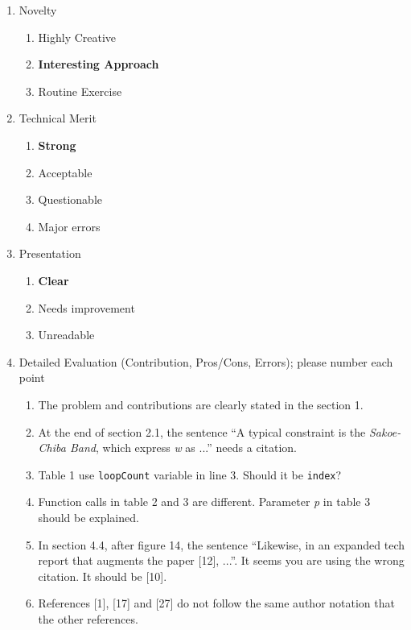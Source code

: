 \documentclass{article}
\begin{document}
\begin{enumerate}
 \item Novelty
 \begin{enumerate}[I]
  \item Highly Creative
  \item \textbf{Interesting Approach}
  \item Routine Exercise
 \end{enumerate} 
 
 \item Technical Merit
 \begin{enumerate}[I]
  \item \textbf{Strong}
  \item Acceptable
  \item Questionable
  \item Major errors
 \end{enumerate} 
 
 \item Presentation
 \begin{enumerate}[I]
  \item \textbf{Clear}
  \item Needs improvement
  \item Unreadable
 \end{enumerate}
 
 \item Detailed Evaluation (Contribution, Pros/Cons, Errors); please number each point
 \begin{framed}
  \begin{enumerate}
    \item The problem and contributions are clearly stated in the section 1.  
    \item At the end of section 2.1, the sentence ``A typical constraint is the \textit{Sakoe-Chiba Band}, which express \textit{w} as ...'' needs a citation.
    \item Table 1 use \texttt{loopCount} variable in line 3. Should it be \texttt{index}?
    \item Function calls in table 2 and 3 are different.  Parameter \textit{p} in table 3 should be explained.
    \item In section 4.4, after figure 14, the sentence ``Likewise, in an expanded tech report that augments the paper [12], ...''.  It seems you are using the wrong citation. It should be [10].
    \item References [1], [17] and [27] do not follow the same author notation that the other references.
  \end{enumerate}
 \end{framed}
 

\end{enumerate}
\end{document}
